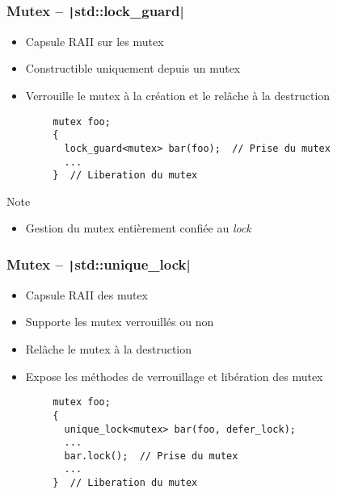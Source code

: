 \documentclass[C++.tex]{subfiles}
\begin{document}
\begin{frame}[fragile]
	\frametitle{Mutex -- \texttt|std::lock_guard|}
	\begin{itemize}
		\item Capsule RAII sur les mutex
		\item Constructible uniquement depuis un mutex
		\item Verrouille le mutex à la création et le relâche à la destruction
	\end{itemize}

	\begin{verbatim}
		mutex foo;
		{
		  lock_guard<mutex> bar(foo);  // Prise du mutex
		  ...
		}  // Liberation du mutex
	\end{verbatim}

	\begin{block}{Note}
		\begin{itemize}
			\item Gestion du mutex entièrement confiée au \textit{lock}
		\end{itemize}
	\end{block}
\end{frame}

\begin{frame}[fragile]
	\frametitle{Mutex -- \texttt|std::unique_lock|}
	\begin{itemize}
		\item Capsule RAII des mutex
		\item Supporte les mutex verrouillés ou non
		\item Relâche le mutex à la destruction
		\item Expose les méthodes de verrouillage et libération des mutex
	\end{itemize}

	\begin{verbatim}
		mutex foo;
		{
		  unique_lock<mutex> bar(foo, defer_lock);
		  ...
		  bar.lock();  // Prise du mutex
		  ...
		}  // Liberation du mutex
	\end{verbatim}
\end{frame}
\end{document}

